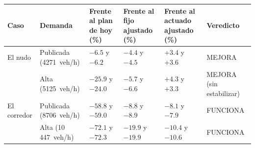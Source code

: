 \begin{tabular}{>{\raggedright\arraybackslash}p{1.7cm}>{\raggedright\arraybackslash}p{2.5cm}>{\raggedright\arraybackslash}p{2.3cm}>{\raggedright\arraybackslash}p{2.3cm}>{\raggedright\arraybackslash}p{2.3cm}>{\raggedright\arraybackslash}p{2.5cm}}
\toprule
Caso & Demanda & Frente al plan de hoy (\%) & Frente al fijo ajustado (\%) & Frente al actuado ajustado (\%) & Veredicto \\
\midrule
El nudo & Publicada (4271~veh/h) & $-6.5$ y $-6.2$ & $-4.4$ y $-4.5$ & $+3.4$ y $+3.6$ & MEJORA \\
 & Alta (5125~veh/h) & $-25.9$ y $-24.0$ & $-5.7$ y $-6.6$ & $+4.3$ y $+3.3$ & MEJORA (sin estabilizar) \\
\midrule
El corredor & Publicada (8706~veh/h) & $-58.8$ y $-59.0$ & $-8.8$ y $-8.9$ & $-8.1$ y $-7.9$ & FUNCIONA \\
 & Alta (10\,447~veh/h) & $-72.1$ y $-72.3$ & $-19.9$ y $-19.9$ & $-10.4$ y $-10.6$ & FUNCIONA \\
\bottomrule
\end{tabular}

